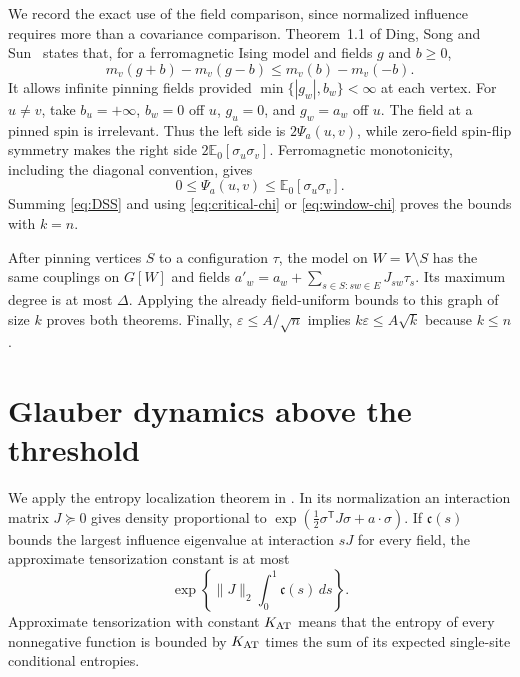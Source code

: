 \documentclass[11pt]{article}
\theoremstyle{remark}
\newcommand{\E}{\mathbb E}
\begin{document}
We record the exact use of the field comparison, since normalized
influence requires more than a covariance comparison.
Theorem~1.1 of Ding, Song and Sun~\cite{DSS} states that, for a
ferromagnetic Ising model and fields $g$ and $b\ge0$,
\[
 m_v(g+b)-m_v(g-b)\le m_v(b)-m_v(-b).
\]
It allows infinite pinning fields provided
$\min\{|g_w|,b_w\}<\infty$ at each vertex.
For $u\ne v$, take $b_u=+\infty$, $b_w=0$ off $u$,
$g_u=0$, and $g_w=a_w$ off $u$.
The field at a pinned spin is irrelevant. Thus the left side is
$2\Psi_a(u,v)$, while zero-field spin-flip symmetry makes the
right side $2\E_0[\sigma_u\sigma_v]$.
Ferromagnetic monotonicity, including the diagonal convention, gives
\begin{equation}\label{eq:DSS}
 0\le\Psi_a(u,v)\le\E_0[\sigma_u\sigma_v].
\end{equation}
Summing \eqref{eq:DSS} and using
\eqref{eq:critical-chi} or \eqref{eq:window-chi} proves the bounds
with $k=n$.

After pinning vertices $S$ to a configuration $\tau$, the model on
$W=V\setminus S$ has the same couplings on $G[W]$ and fields
$a'_w=a_w+\sum_{s\in S:sw\in E}J_{sw}\tau_s$.
Its maximum degree is at most $\Delta$.
Applying the already field-uniform bounds to this graph of size $k$
proves both theorems.
Finally, $\varepsilon\le A/\sqrt n$ implies
$k\varepsilon\le A\sqrt k$ because $k\le n$.

\section{Glauber dynamics above the threshold}

We apply the entropy localization theorem in
\cite[Theorem~3.21]{CCYZ}.
In its normalization an interaction matrix $J\succeq0$ gives density
proportional to $\exp(\frac12\sigma^\mathsf TJ\sigma+a\cdot\sigma)$.
If $\mathfrak c(s)$ bounds the largest influence eigenvalue at interaction $sJ$
for every field, the approximate tensorization constant is at most
\[
 \exp\left\{\|J\|_2\int_0^1\mathfrak c(s)\,ds\right\}.
\]
Approximate tensorization with constant $K_{\rm AT}$ means that
the entropy of every nonnegative function is bounded by
$K_{\rm AT}$ times the sum of its expected single-site conditional
entropies.
\end{document}
